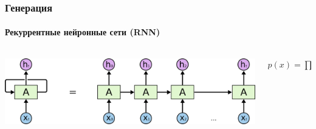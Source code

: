 \documentclass[10pt]{beamer}
\begin{document}
\begin{frame}
\frametitle{Генерация}
\framesubtitle{Рекуррентные нейронные сети (RNN)}


\begin{columns}
    \begin{column}{0.7\textwidth}
        \includegraphics[height=0.25\textheight]{images/rnn_unrolled.png}
    \end{column}
    \begin{column}{0.3\textwidth}
        $p(x) = \prod\limits^{|x| - 1}_{i=0}{p(x_i | x_{<i})}$
    \end{column}
\end{columns}


\end{frame}
\end{document}
